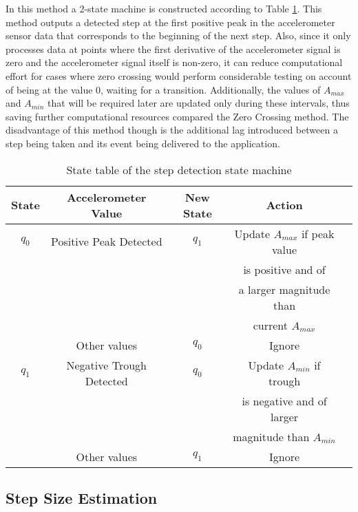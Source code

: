 In this method a 2-state machine is constructed according to Table
\ref{tbl:peak_valley_state_table}. This method outputs a detected step at 
the first positive peak in the accelerometer sensor data that corresponds to 
the beginning of the next step. Also, since it only processes data at 
points where the first derivative of the accelerometer signal is zero and 
the accelerometer signal itself is non-zero, it can reduce computational 
effort for cases where zero crossing would perform considerable testing
on account of being at the value 0, waiting for a transition. Additionally,
the values of $A_{max}$ and $A_{min}$ that will be required later are 
updated only during these intervals, thus saving further computational 
resources compared the Zero Crossing method. The disadvantage of this method
though is the additional lag introduced between a step being taken and its 
event being delivered to the application.

\begin{table}[h]\centering
    \caption{State table of the step detection state machine\label{tbl:peak_valley_state_table}}
    \begin{tabular}{ccccc} \hline
    State & Accelerometer Value     & New State &  Action\\     \hline
    $q_0$ & Positive Peak Detected  & $q_1$     & Update $A_{max}$ if peak value  \\ 
          &                         &           & is positive and of \\
          &                         &           & a larger magnitude than \\
          &                         &           & current $A_{max}$ \\
          & Other values            & $q_0$     & Ignore \\         \hline
    $q_1$ & Negative Trough Detected & $q_0$    & Update $A_{min}$ if trough \\
          &                         &           & is negative and of larger \\ 
          &                         &           & magnitude than $A_{min}$ \\
          & Other values            & $q_1$     & Ignore \\ \hline
    \end{tabular}
\end{table}

\subsection{Step Size Estimation}

